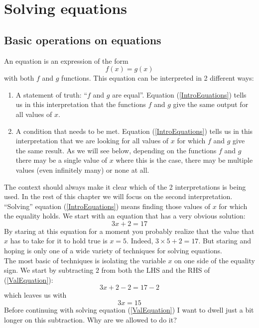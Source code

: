 \section{Solving equations}
\label{EqSolveBasics}
\subsection{Basic operations on equations}
\noindent An equation is an expression of the form
\begin{equation}
\label{IntroEquations}
f(x) = g(x)
\end{equation}
with both $f$ and $g$ functions. This equation can be interpreted in 2 different ways:
\begin{enumerate}[i]
\item A statement of truth: "`$f$ and $g$ are equal"'. Equation (\ref{IntroEquations}) tells us in this interpretation that the functions $f$ and $g$ give the same output for all values of $x$.
\item A condition that needs to be met. Equation (\ref{IntroEquations}) tells us in this interpretation that we are looking for all values of $x$ for which $f$ and $g$ give the same result. As we will see below, depending on the functions $f$ and $g$ there may be a single value of $x$ where this is the case, there may be multiple values (even infinitely many) or none at all.
\end{enumerate}
\noindent The context should always make it clear which of the 2 interpretations is being used. In the rest of this chapter we will focus on the second interpretation.\\

\noindent "`Solving"' equation (\ref{IntroEquations}) means finding those values of $x$ for which the equality holds. We start with an equation that has a very obvious solution:
\begin{equation}
3x +2 = 17
\label{ValEquation}
\end{equation}
By staring at this equation for a moment you probably realize that the value that $x$ has to take for it to hold true is $x=5$. Indeed, $3 \times 5 + 2 = 17$. But staring and hoping is only one of a wide variety of techniques for solving equations.\\

\noindent The most basic of techniques is isolating the variable $x$ on one side of the equality sign. We start by subtracting $2$ from both the LHS and the RHS of (\ref{ValEquation}):
$$
 3x + 2 - 2   =  17 - 2
$$
which leaves us with
$$
3x = 15
$$
Before continuing with solving equation (\ref{ValEquation}) I want to dwell just a bit longer on this subtraction. Why are we allowed to do it?\\

